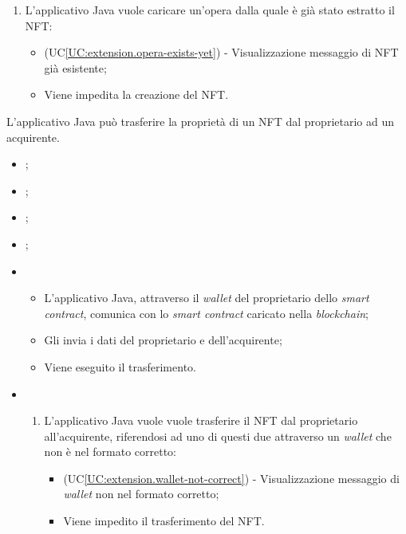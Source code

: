 \begin{itemize}
\begin{enumerate}[label=\lett]
    \item L'applicativo Java vuole caricare un'opera dalla quale è già stato estratto il NFT:
    \begin{itemize}
      \item (UC\ref{UC:extension.opera-exists-yet}) - Visualizzazione messaggio di NFT già esistente;
      \item Viene impedita la creazione del NFT.
    \end{itemize}
  \end{enumerate}
\end{itemize}


L'applicativo Java può trasferire la proprietà di un NFT dal proprietario ad un acquirente.

\begin{itemize}
  \item {};
  \item {};
  \item {};
  \item {};
  
  \item \UCMain
  \begin{itemize}
    \item L'applicativo Java, attraverso il \textit{wallet} del proprietario dello \textit{smart contract}, comunica con lo \textit{smart contract} caricato nella \textit{blockchain};
    \item Gli invia i dati del proprietario e dell'acquirente;
    \item Viene eseguito il trasferimento.
  \end{itemize}

  \item \UCExt
  \begin{enumerate}[label=\lett]
    \item L'applicativo Java vuole vuole trasferire il NFT dal proprietario all'acquirente, riferendosi ad uno di questi due attraverso un \textit{wallet} che non è nel formato corretto:
    \begin{itemize}
      \item (UC\ref{UC:extension.wallet-not-correct}) - Visualizzazione messaggio di \textit{wallet} non nel formato corretto;
      \item Viene impedito il trasferimento del NFT.
    \end{itemize}


\end{enumerate}
\end{itemize}
